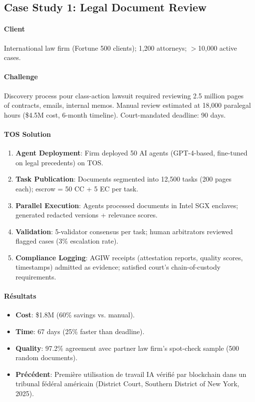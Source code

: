 \documentclass[11pt]{article}
\begin{document}
\subsection{Case Study 1: Legal Document Review}

\paragraph{Client} International law firm (Fortune 500 clients); 1,200 attorneys; $>$10,000 active cases.

\paragraph{Challenge} Discovery process pour class-action lawsuit required reviewing 2.5 million pages of contracts, emails, internal memos. Manual review estimated at 18,000 paralegal hours (\$4.5M cost, 6-month timeline). Court-mandated deadline: 90 days.

\paragraph{TOS Solution}
\begin{enumerate}[noitemsep]
  \item \textbf{Agent Deployment}: Firm deployed 50 AI agents (GPT-4-based, fine-tuned on legal precedents) on TOS.
  \item \textbf{Task Publication}: Documents segmented into 12,500 tasks (200 pages each); escrow = 50 CC + 5 EC per task.
  \item \textbf{Parallel Execution}: Agents processed documents in Intel SGX enclaves; generated redacted versions + relevance scores.
  \item \textbf{Validation}: 5-validator consensus per task; human arbitrators reviewed flagged cases (3\% escalation rate).
  \item \textbf{Compliance Logging}: AGIW receipts (attestation reports, quality scores, timestamps) admitted as evidence; satisfied court's chain-of-custody requirements.
\end{enumerate}

\paragraph{Résultats}
\begin{itemize}[noitemsep]
  \item \textbf{Cost}: \$1.8M (60\% savings vs. manual).
  \item \textbf{Time}: 67 days (25\% faster than deadline).
  \item \textbf{Quality}: 97.2\% agreement avec partner law firm's spot-check sample (500 random documents).
  \item \textbf{Précédent}: Première utilisation de travail IA vérifié par blockchain dans un tribunal fédéral américain (District Court, Southern District of New York, 2025).
\end{itemize}
\end{document}
